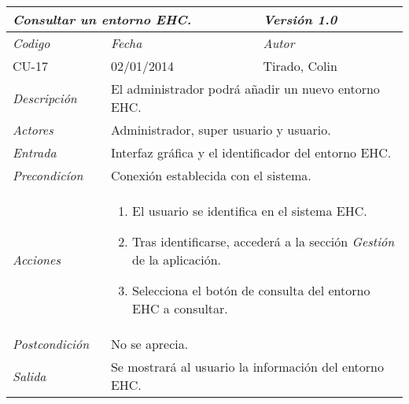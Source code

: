 \begin{center}
    \begin{tabular}{|p{3cm}|p{4cm}|p{4cm}|p{4cm}|}
    \hline \multicolumn{3}{|p{9cm}|}{\textit{Consultar un entorno EHC.}} & \textit{Versi\'on 1.0} \\
	\hline \textit{Codigo} & \textit{Fecha} & \multicolumn{2}{|p{6cm}|}{\textit{Autor}} \\
	CU-17 & 02/01/2014 & \multicolumn{2}{|p{6cm}|}{Tirado, Colin} \\		
    \hline \textit{Descripci\'on} & \multicolumn{3}{|p{9cm}|}{El administrador podr\'a a\~nadir un nuevo entorno EHC.} \\
    \hline \textit{Actores} & \multicolumn{3}{|p{9cm}|}{Administrador, super usuario y usuario.} \\
    \hline \textit{Entrada} & \multicolumn{3}{|p{9cm}|}{Interfaz gr\'afica y el identificador del entorno EHC.} \\
    \hline \textit{Precondic\'ion} & \multicolumn{3}{|p{9cm}|}{Conexi\'on establecida con el sistema.} \\
    \hline \textit{Acciones} & \multicolumn{3}{|p{9cm}|}{
        \begin{enumerate}
        \item El usuario se identifica en el sistema EHC.
        \item Tras identificarse, acceder\'a a la secci\'on \textit{Gesti\'on} de la aplicaci\'on.
		\item Selecciona el bot\'on de consulta del entorno EHC a consultar.
        \end{enumerate}
           } \\
    \hline \textit{Postcondici\'on} & \multicolumn{3}{|p{9cm}|}{No se aprecia.} \\
    \hline \textit{Salida} & \multicolumn{3}{|p{9cm}|}{Se mostrar\'a al usuario la informaci\'on del entorno EHC.} \\ \hline
    \end{tabular}
\end{center}